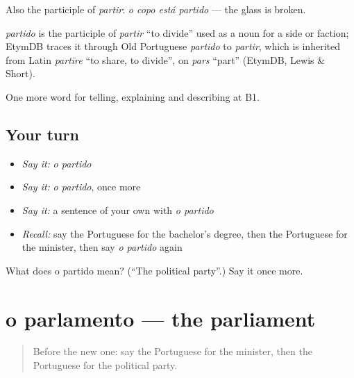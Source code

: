 Also the participle of \emph{partir}: \emph{o copo está partido} — the glass is broken.

\begin{cousinweb}
\emph{partido} is the participle of \emph{partir} \textquotedblleft{}to divide\textquotedblright{} used as a noun for a side or faction; EtymDB traces it through Old Portuguese \emph{partido} to \emph{partir}, which is inherited from Latin \emph{partīre} \textquotedblleft{}to share, to divide\textquotedblright{}, on \emph{pars} \textquotedblleft{}part\textquotedblright{} (EtymDB, Lewis \& Short).
\end{cousinweb}

\begin{grammarlens}[title={What you've built}]
One more word for telling, explaining and describing at B1.
\end{grammarlens}

\subsection*{Your turn}
\begin{itemize}
\raggedright
  \item \emph{Say it:} \emph{o partido}
  \item \emph{Say it:} \emph{o partido}, once more
  \item \emph{Say it:} a sentence of your own with \emph{o partido}
  \item \emph{Recall:} say the Portuguese for the bachelor's degree, then the Portuguese for the minister, then say \emph{o partido} again
\end{itemize}

\begin{tcolorbox}[breakable,colback=teal!4,colframe=teal!35!black,title={Before you move on}]
What does o partido mean? (\textquotedblleft{}The political party\textquotedblright{}.) Say it once more.
\end{tcolorbox}
\section[o parlamento]{o parlamento — the parliament}

\label{lesson:PT-C380-parlamento}



\begin{quote}
Before the new one: say the Portuguese for the minister, then the Portuguese for the political party.
\end{quote}

